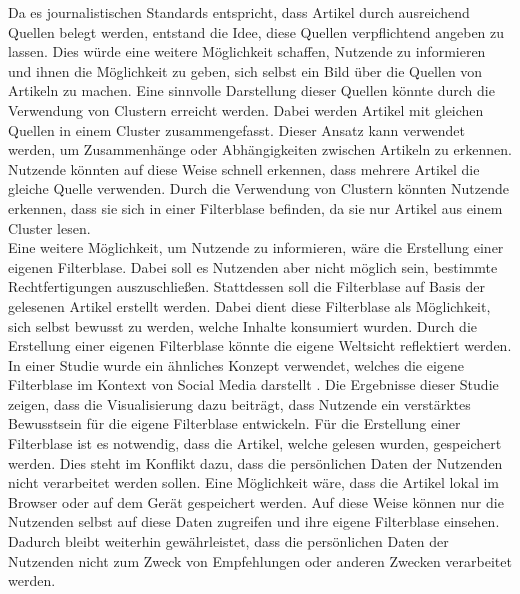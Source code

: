 Da es journalistischen Standards entspricht, dass Artikel durch ausreichend Quellen belegt werden, entstand die Idee, diese Quellen verpflichtend angeben zu lassen.
Dies würde eine weitere Möglichkeit schaffen, Nutzende zu informieren und ihnen die Möglichkeit zu geben, sich selbst ein Bild über die Quellen von Artikeln zu machen.
Eine sinnvolle Darstellung dieser Quellen könnte durch die Verwendung von Clustern erreicht werden.
Dabei werden Artikel mit gleichen Quellen in einem Cluster zusammengefasst.
Dieser Ansatz kann verwendet werden, um Zusammenhänge oder Abhängigkeiten zwischen Artikeln zu erkennen.
Nutzende könnten auf diese Weise schnell erkennen, dass mehrere Artikel die gleiche Quelle verwenden.
Durch die Verwendung von Clustern könnten Nutzende erkennen, dass sie sich in einer Filterblase befinden, da sie nur Artikel aus einem Cluster lesen. \\

Eine weitere Möglichkeit, um Nutzende zu informieren, wäre die Erstellung einer eigenen Filterblase.
Dabei soll es Nutzenden aber nicht möglich sein, bestimmte Rechtfertigungen auszuschließen.
Stattdessen soll die Filterblase auf Basis der gelesenen Artikel erstellt werden.
Dabei dient diese Filterblase als Möglichkeit, sich selbst bewusst zu werden, welche Inhalte konsumiert wurden.
Durch die Erstellung einer eigenen Filterblase könnte die eigene Weltsicht reflektiert werden.
In einer Studie wurde ein ähnliches Konzept verwendet, welches die eigene Filterblase im Kontext von Social Media darstellt \cite{social-media-bubble}.
Die Ergebnisse dieser Studie zeigen, dass die Visualisierung dazu beiträgt, dass Nutzende ein verstärktes Bewusstsein für die eigene Filterblase entwickeln.
Für die Erstellung einer Filterblase ist es notwendig, dass die Artikel, welche gelesen wurden, gespeichert werden.
Dies steht im Konflikt dazu, dass die persönlichen Daten der Nutzenden nicht verarbeitet werden sollen.
Eine Möglichkeit wäre, dass die Artikel lokal im Browser oder auf dem Gerät gespeichert werden.
Auf diese Weise können nur die Nutzenden selbst auf diese Daten zugreifen und ihre eigene Filterblase einsehen.
Dadurch bleibt weiterhin gewährleistet, dass die persönlichen Daten der Nutzenden nicht zum Zweck von Empfehlungen oder anderen Zwecken verarbeitet werden.\\
